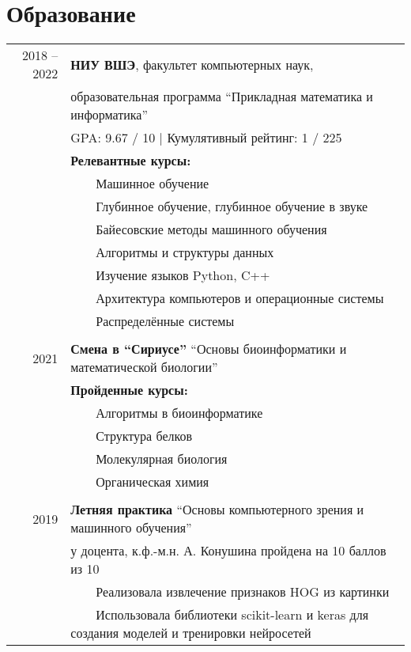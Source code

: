 \documentclass[a4paper,10pt]{article}
\newcommand{\tabitem}{~~\llap{\textbullet}~~}
\begin{document}
\section{Образование}
\begin{tabular}{rl}	
2018 -- 2022 & \textbf{НИУ ВШЭ}, факультет компьютерных наук, \\ & образовательная программа ``Прикладная математика и информатика''\\
& GPA: 9.67 / 10 | Кумулятивный рейтинг: 1 / 225 \\
& \textbf{Релевантные курсы:}\\
& \tabitem Машинное обучение \\
& \tabitem Глубинное обучение, глубинное обучение в звуке \\
& \tabitem Байесовские методы машинного обучения \\
& \tabitem Алгоритмы и структуры данных \\
& \tabitem Изучение языков Python, C++ \\
& \tabitem Архитектура компьютеров и операционные системы \\
& \tabitem Распределённые системы \\
& \\
2021 & \textbf{Смена в ``Сириусе''} ``Основы биоинформатики и математической биологии''\\
& \textbf{Пройденные курсы:} \\
& \tabitem Алгоритмы в биоинформатике \\
& \tabitem Структура белков \\
& \tabitem Молекулярная биология \\
& \tabitem Органическая химия \\
& \\
2019 & \textbf{Летняя практика} ``Основы компьютерного зрения и машинного обучения'' \\
& у доцента, к.ф.-м.н. А. Конушина пройдена на 10 баллов из 10 \\
& \tabitem Реализовала извлечение признаков HOG из картинки \\
& \tabitem Использовала библиотеки scikit-learn и keras для создания моделей и тренировки нейросетей 
\end{tabular}
\end{document}
